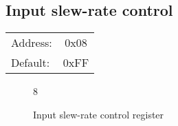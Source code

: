 \documentclass{article}
\begin{document}
	\subsection{Input slew-rate control}
	
	\begin{tabular}{ l c }
		Address: & 0x08 \\
		Default: & 0xFF \\
	\end{tabular}
	
	\begin{figure}[H]
		\centering
		\begin{bytefield}[
			bitwidth=0.1\linewidth]{8}
			 \\
		\end{bytefield}
		\caption{Input slew-rate control register}
		\label{reg:input_slew}
	\end{figure}
	
\end{document}
